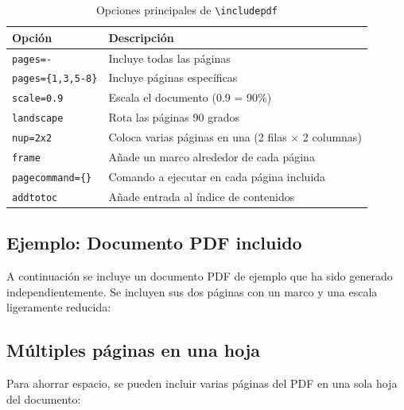 \begin{table}[htbp]
  \centering
  \caption{Opciones principales de \texttt{\textbackslash includepdf}}
  \label{tab:opciones-includepdf}
  \EPScabeceraTabla
  \begin{tabular}{lp{8cm}}
    \toprule
    \textbf{Opción} & \textbf{Descripción} \\
    \midrule
    \texttt{pages=-} & Incluye todas las páginas \\
    \texttt{pages=\{1,3,5-8\}} & Incluye páginas específicas \\
    \texttt{scale=0.9} & Escala el documento (0.9 = 90\%) \\
    \texttt{landscape} & Rota las páginas 90 grados \\
    \texttt{nup=2x2} & Coloca varias páginas en una (2 filas × 2 columnas) \\
    \texttt{frame} & Añade un marco alrededor de cada página \\
    \texttt{pagecommand=\{\}} & Comando a ejecutar en cada página incluida \\
    \texttt{addtotoc} & Añade entrada al índice de contenidos \\
    \bottomrule
  \end{tabular}
\end{table}

\subsection{Ejemplo: Documento PDF incluido}
\label{subsec:ejemplo-pdf-incluido}

A continuación se incluye un documento PDF de ejemplo que ha sido generado
independientemente. Se incluyen sus dos páginas con un marco y una escala
ligeramente reducida:



\subsection{Múltiples páginas en una hoja}
\label{subsec:nup-pdf}

Para ahorrar espacio, se pueden incluir varias páginas del PDF en una sola
hoja del documento:

